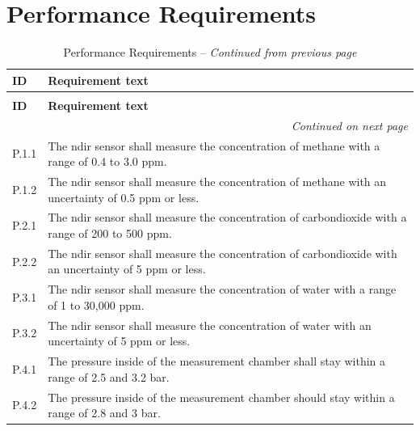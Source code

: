 \documentclass[
  a4paper,
  11pt,
  openany,
  parskip,
  toc=totoc,
  listof=totoc,
  bibliography=totoc
]{scrreprt}
\begin{document}
\section{Performance Requirements}

\begin{longtable}{|p{2cm}|p{12cm}|}
\caption{Performance Requirements}
\label{tab:performance_req}\\
\hline
\textbf{ID} & \textbf{Requirement text} \\
\hline
\endfirsthead
\caption[]{Performance Requirements -- \textit{Continued from previous page}} \\
\hline
\textbf{ID} & \textbf{Requirement text} \\
\hline
\endhead
\hline
\multicolumn{2}{r}{\textit{Continued on next page}} \\
\endfoot
\hline
\endlastfoot
P.1.1 & The \gls{ndir} sensor shall measure the concentration of methane with a range of 0.4 to 3.0 ppm. \\
\hline
P.1.2 & The \gls{ndir} sensor shall measure the concentration of methane with an uncertainty of 0.5 ppm or less. \\
\hline
P.2.1 & The \gls{ndir} sensor shall measure the concentration of carbondioxide with a range of 200 to 500 ppm. \\
\hline
P.2.2 & The \gls{ndir} sensor shall measure the concentration of carbondioxide with an uncertainty of 5 ppm or less. \\
\hline
P.3.1 & The \gls{ndir} sensor shall measure the concentration of water with a range of 1 to 30,000 ppm. \\
\hline
P.3.2 & The \gls{ndir} sensor shall measure the concentration of water with an uncertainty of 5 ppm or less. \\
\hline
P.4.1 & The pressure inside of the measurement chamber shall stay within a range of 2.5 and 3.2 bar. \\
\hline
P.4.2 & The pressure inside of the measurement chamber should stay within a range of 2.8 and 3 bar. \\

\end{longtable}
\end{document}
